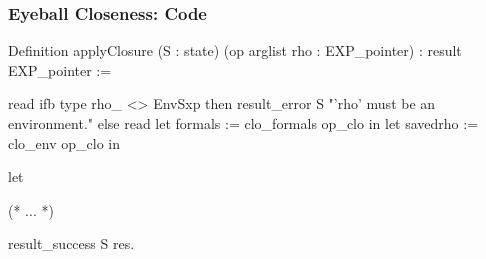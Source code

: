 \documentclass{beamer}
\begin{document}
\begin{frame}[fragile]
    \frametitle{Eyeball Closeness: \Coq{} Code}

\begin{changemargin}{-5mm}{-5mm}
\begin{coqcode}
Definition applyClosure (S : state) (op arglist rho : EXP_pointer)
    : result EXP_pointer :=

  read%
  ifb type rho_ <> EnvSxp then
    result_error S "'rho' must be an environment."
  else
    read%
    let formals := clo_formals op_clo in
    let savedrho := clo_env op_clo in

    let%

    (* ... *)

    result_success S res.
\end{coqcode}
\end{changemargin}

\end{frame}
\end{document}
